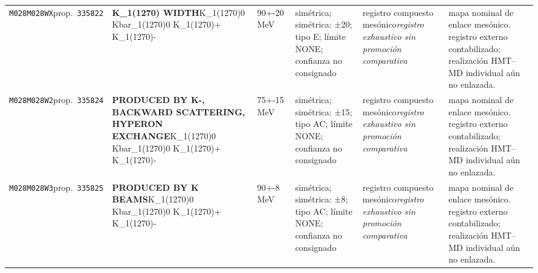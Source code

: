 \begin{landscape}
\begin{longtable}{L{1.85cm}L{4.45cm}L{2.35cm}L{4.05cm}L{3.35cm}L{7.15cm}}
\texttt{M028}\newline \texttt{M028WX}\newline prop.\ \texttt{335822} & \textbf{K\_\allowbreak{}1(1270) WIDTH}\newline K\_\allowbreak{}1(1270)0 \textbar{}\allowbreak{} Kbar\_\allowbreak{}1(1270)0 \textbar{}\allowbreak{} K\_\allowbreak{}1(1270)+ \textbar{}\allowbreak{} K\_\allowbreak{}1(1270)- & 90+-20\,MeV & simétrica; simétrica: ±20; tipo E; límite NONE; confianza no consignado & registro compuesto mesónico\newline \emph{registro exhaustivo sin promoción comparativa} & mapa nominal de enlace mesónico. registro externo contabilizado; realización HMT--MD individual aún no enlazada. \\
\texttt{M028}\newline \texttt{M028W2}\newline prop.\ \texttt{335824} & \textbf{PRODUCED BY K-, BACKWARD SCATTERING, HYPERON EXCHANGE}\newline K\_\allowbreak{}1(1270)0 \textbar{}\allowbreak{} Kbar\_\allowbreak{}1(1270)0 \textbar{}\allowbreak{} K\_\allowbreak{}1(1270)+ \textbar{}\allowbreak{} K\_\allowbreak{}1(1270)- & 75+-15\,MeV & simétrica; simétrica: ±15; tipo AC; límite NONE; confianza no consignado & registro compuesto mesónico\newline \emph{registro exhaustivo sin promoción comparativa} & mapa nominal de enlace mesónico. registro externo contabilizado; realización HMT--MD individual aún no enlazada. \\
\texttt{M028}\newline \texttt{M028W3}\newline prop.\ \texttt{335825} & \textbf{PRODUCED BY K BEAMS}\newline K\_\allowbreak{}1(1270)0 \textbar{}\allowbreak{} Kbar\_\allowbreak{}1(1270)0 \textbar{}\allowbreak{} K\_\allowbreak{}1(1270)+ \textbar{}\allowbreak{} K\_\allowbreak{}1(1270)- & 90+-8\,MeV & simétrica; simétrica: ±8; tipo AC; límite NONE; confianza no consignado & registro compuesto mesónico\newline \emph{registro exhaustivo sin promoción comparativa} & mapa nominal de enlace mesónico. registro externo contabilizado; realización HMT--MD individual aún no enlazada. \\

\end{longtable}
\end{landscape}
